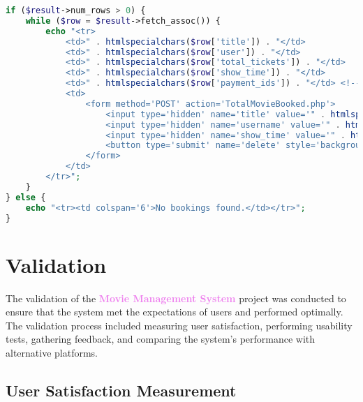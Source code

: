 \documentclass[a4paper,12pt]{article}  %
\renewcommand{\textbf}[1]{\textcolor{violet}{\bfseries #1}}
\begin{document}
\begin{lstlisting}[language=PHP, caption={Display Booking Data and Delete Action}, label={lst:booking_delete_action}]
if ($result->num_rows > 0) {
    while ($row = $result->fetch_assoc()) {
        echo "<tr>
            <td>" . htmlspecialchars($row['title']) . "</td>
            <td>" . htmlspecialchars($row['user']) . "</td>
            <td>" . htmlspecialchars($row['total_tickets']) . "</td>
            <td>" . htmlspecialchars($row['show_time']) . "</td>
            <td>" . htmlspecialchars($row['payment_ids']) . "</td> <!-- Display Payment IDs -->
            <td>
                <form method='POST' action='TotalMovieBooked.php'>
                    <input type='hidden' name='title' value='" . htmlspecialchars($row['title']) . "'>
                    <input type='hidden' name='username' value='" . htmlspecialchars($row['user']) . "'>
                    <input type='hidden' name='show_time' value='" . htmlspecialchars($row['show_time']) . "'>
                    <button type='submit' name='delete' style='background-color: #4A0000; color: white; border: none; padding: 5px 10px; cursor: pointer;'>Delete</button>
                </form>
            </td>
        </tr>";
    }
} else {
    echo "<tr><td colspan='6'>No bookings found.</td></tr>";
}
\end{lstlisting}













\clearpage




\section{Validation} \label{sec:val}

The validation of the \textbf{Movie Management System} project was conducted to ensure that the system met the expectations of users and performed optimally. The validation process included measuring user satisfaction, performing usability tests, gathering feedback, and comparing the system’s performance with alternative platforms.

\subsection{User Satisfaction Measurement}
\end{document}
